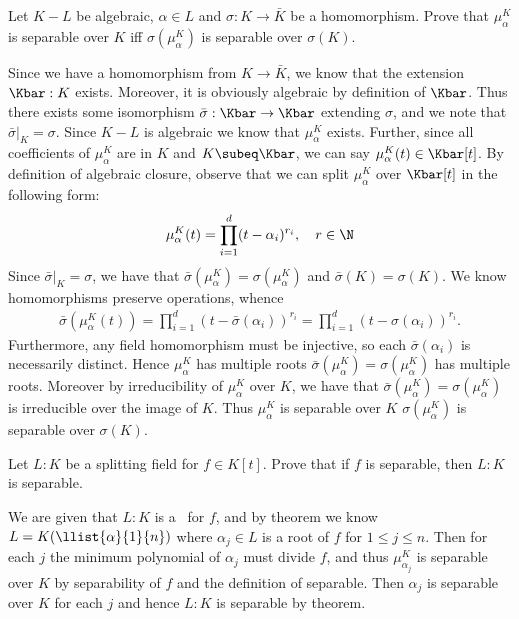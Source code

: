 \documentclass{article}
\begin{document}
\begin{subexercise}
  Let \( K-L \) be algebraic, \( \alpha\in L \) and \( \sigma:K\to \bar K \) be a homomorphism.
  Prove that \( \mu_\alpha^K \) is separable over \( K \) iff \( \sigma(\mu_\alpha^K) \) is separable over \( \sigma(K) \).
\end{subexercise}
\begin{solution}
  Since we have a homomorphism from \( K\to \bar K \), we know that the extension \( \Kbar:K \) exists.
  Moreover, it is obviously algebraic by definition of \( \Kbar \).
  Thus there exists some isomorphism \( \bar\sigma:\Kbar\to\Kbar \) extending \( \sigma \), and we note that \( \bar\sigma|_{K} = \sigma \).
  Since \( K-L \) is algebraic we know that \( \mu_\alpha^K \) exists.
  Further, since all coefficients of \( \mu_\alpha^K \) are in \( K \) and \( K \subeq \Kbar \), we can say \( \mu_\alpha^K(t)\in \Kbar[t] \).
  By definition of algebraic closure, observe that we can split \( \mu_\alpha^K \) over \( \Kbar[t] \) in the following form: \begin{align*}
    \mu_\alpha^K(t) = \prod_{i=1}^{d}(t-\alpha_i)^{r_i},\quad r\in \N
  \end{align*}
  Since \( \bar\sigma|_{K} = \sigma \), we have that \( \bar\sigma(\mu_\alpha^K) = \sigma(\mu_\alpha^K) \) and \( \bar\sigma(K) = \sigma(K) \).
  We know homomorphisms preserve operations, whence
  \begin{align*}
    \bar\sigma\left(\mu_\alpha^K(t)\right) = \prod_{i=1}^{d}(t-\bar\sigma(\alpha_i))^{r_i} = \prod_{i=1}^{d}(t-\sigma(\alpha_i))^{r_i}.
  \end{align*}
  Furthermore, any field homomorphism must be injective, so each \( \bar\sigma(\alpha_i) \) is necessarily distinct.
  Hence \( \mu_\alpha^K \) has multiple roots \iff \( \bar\sigma(\mu_\alpha^K)=\sigma(\mu_\alpha^K) \) has multiple roots.
  Moreover by irreducibility of \( \mu_\alpha^K \) over \( K \), we have that \( \bar\sigma(\mu_\alpha^K) = \sigma(\mu_\alpha^K) \) is irreducible over the image of \( K \).
  Thus \( \mu_\alpha^K \) is separable over \( K \) \iff \( \sigma(\mu_\alpha^K) \) is separable over \( \sigma(K) \).
\end{solution}

\begin{subexercise} \label{ex:sfe1}
  Let \( L:K \) be a splitting field for \( f\in K[t] \).
  Prove that if \( f \) is separable, then \( L:K \) is separable.
\end{subexercise}
\begin{solution}
  We are given that \( L:K \) is a \sfe~for \( f \), and by theorem we know \( L=K(\llist{\alpha}{1}{n}) \) where \( \alpha_j\in L \) is a root of \( f \) for \( 1\leq j\leq n \).
  Then for each \( j \) the minimum polynomial of \( \alpha_j \) must divide \( f \), and thus \( \mu_{\alpha_j}^K \) is separable over \( K \) by separability of \( f \) and the definition of separable.
  Then \( \alpha_j \) is separable over \( K \) for each \( j \) and hence \( L:K \) is separable by theorem.
\end{solution}
\end{document}
